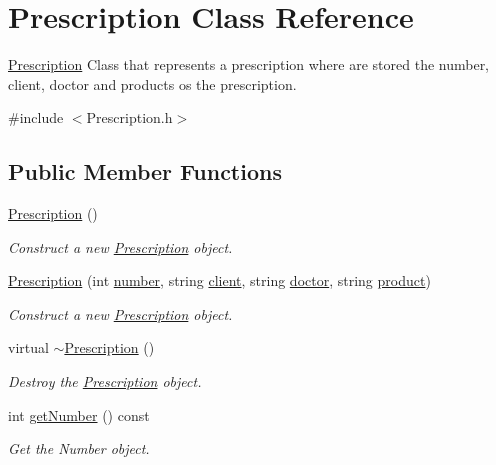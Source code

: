 \hypertarget{classPrescription}{}\section{Prescription Class Reference}
\label{classPrescription}


\hyperlink{classPrescription}{Prescription} Class that represents a prescription where are stored the number, client, doctor and products os the prescription.  




{\ttfamily \#include $<$Prescription.\+h$>$}

\subsection*{Public Member Functions}
\begin{DoxyCompactItemize}
\item 
\hyperlink{classPrescription_a8dce6fbdb5b57a18c45de8992bf5d600}{Prescription} ()
\begin{DoxyCompactList}\small\item\em Construct a new \hyperlink{classPrescription}{Prescription} object. \end{DoxyCompactList}\item 
\hyperlink{classPrescription_a7be35e4e8ddb08878fd4fcbf308f9d2b}{Prescription} (int \hyperlink{classPrescription_a4b3dcfe55dff479143e63cf7778ffa12}{number}, string \hyperlink{classPrescription_a3a2d122c0229cd7985595cae3ab497c3}{client}, string \hyperlink{classPrescription_abf1e3c58a207e521294815884ffc6682}{doctor}, string \hyperlink{classPrescription_ab9556fbe876105624867e2f360617688}{product})
\begin{DoxyCompactList}\small\item\em Construct a new \hyperlink{classPrescription}{Prescription} object. \end{DoxyCompactList}\item 
virtual \hyperlink{classPrescription_a79779a7a4954ae3566411772a5313a88}{$\sim$\+Prescription} ()
\begin{DoxyCompactList}\small\item\em Destroy the \hyperlink{classPrescription}{Prescription} object. \end{DoxyCompactList}\item 
int \hyperlink{classPrescription_a6a89f632894bee1e959973d26f0b4cc8}{get\+Number} () const
\begin{DoxyCompactList}\small\item\em Get the Number object. \end{DoxyCompactList}\item 

\end{DoxyCompactItemize}
